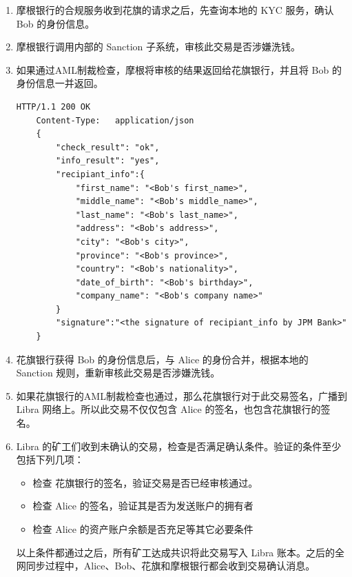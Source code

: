 \begin{enumerate}
    \item 摩根银行的合规服务收到花旗的请求之后，先查询本地的 KYC 服务，确认 Bob 的身份信息。

    \item 摩根银行调用内部的 Sanction 子系统，审核此交易是否涉嫌洗钱。

    \item 如果通过AML制裁检查，摩根将审核的结果返回给花旗银行，并且将 Bob 的身份信息一并返回。

    \begin{lstlisting}[caption={摩根银行向花旗银行返回审核结果}, label={lst:jpm_reply}]
    HTTP/1.1 200 OK
    Content-Type:   application/json
    {
        "check_result": "ok",
        "info_result": "yes",
        "recipiant_info":{
            "first_name": "<Bob's first_name>",
            "middle_name": "<Bob's middle_name>",
            "last_name": "<Bob's last_name>",
            "address": "<Bob's address>",
            "city": "<Bob's city>",
            "province": "<Bob's province>",
            "country": "<Bob's nationality>",
            "date_of_birth": "<Bob's birthday>",
            "company_name": "<Bob's company name>"
        }
        "signature":"<the signature of recipiant_info by JPM Bank>"
    }
    \end{lstlisting}

    \item 花旗银行获得 Bob 的身份信息后，与 Alice 的身份合并，根据本地的 Sanction 规则，重新审核此交易是否涉嫌洗钱。

    \item 如果花旗银行的AML制裁检查也通过，那么花旗银行对于此交易签名，广播到 Libra 网络上。所以此交易不仅仅包含 Alice 的签名，也包含花旗银行的签名。

    \item Libra 的矿工们收到未确认的交易，检查是否满足确认条件。验证的条件至少包括下列几项：
        \begin{itemize}
            \item   检查 花旗银行的签名，验证交易是否已经审核通过。
            \item   检查 Alice 的签名，验证其是否为发送账户的拥有者
            \item   检查 Alice 的资产账户余额是否充足等其它必要条件
        \end{itemize}
        以上条件都通过之后，所有矿工达成共识将此交易写入 Libra 账本。之后的全网同步过程中，Alice、Bob、花旗和摩根银行都会收到交易确认消息。


\end{enumerate}
